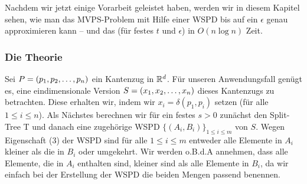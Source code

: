  Nachdem wir jetzt einige Vorarbeit geleistet haben, werden wir in diesem Kapitel sehen, wie man das MVPS-Problem mit Hilfe einer WSPD bis auf ein $\epsilon$ genau approximieren kann -- und das (für festes $t$ und $\epsilon$) in $O(n\log n)$ Zeit.
    
    \subsubsection*{Die Theorie}
    Sei $P = (p_1, p_2, \mathellipsis, p_n)$ ein Kantenzug in $\mathbb{R}^d$. 
    Für unseren Anwendungsfall genügt es, eine eindimensionale Version $S = (x_1, x_2, \mathellipsis, x_n)$ dieses Kantenzugs zu betrachten. 
    Diese erhalten wir, indem wir $x_i = \delta(p_1, p_i)$ setzen (für alle $1 \leq i \leq n$).
    Als Nächstes berechnen wir für ein festes $s > 0$ zunächst den Split-Tree T und danach eine zugehörige WSPD $\{(A_i, B_i)\}_{1 \leq i \leq m}$ von $S$. 
    Wegen Eigenschaft (3) der WSPD sind für alle $1 \leq i \leq m$ entweder alle Elemente in $A_i$ kleiner als die in $B_i$ oder umgekehrt. 
    Wir werden o.B.d.A annehmen, dass alle Elemente, die in $A_i$ enthalten sind, kleiner sind als alle Elemente in $B_i$, da wir einfach bei der Erstellung der WSPD die beiden Mengen passend benennen.
    
